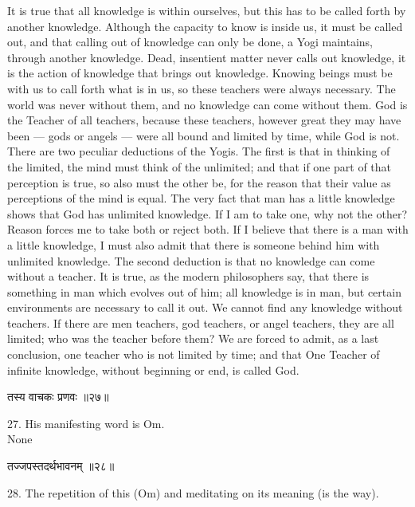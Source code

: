 It is true that all knowledge is within ourselves, but this
has to be called forth by another knowledge. Although the capacity to
know is inside us, it must be called out, and that calling out of
knowledge can only be done, a Yogi maintains, through another
knowledge. Dead, insentient matter never calls out knowledge, it is the
action of knowledge that brings out knowledge. Knowing beings must be
with us to call forth what is in
us, so these teachers were always necessary. The world was never
without them, and no knowledge can come without them. God is the
Teacher of all teachers, because these teachers, however great they may
have been — gods or angels — were all bound and limited by time, while
God is not. There are two peculiar deductions of the Yogis. The first
is that in thinking of the limited, the mind must think of the
unlimited; and that if one part of that perception is true, so also
must the other be, for the reason that their value as perceptions of
the mind is equal. The very fact that man has a little knowledge shows
that God has unlimited knowledge. If I am to take one, why not the
other? Reason forces me to take both or reject both. If I believe that
there is a man with a little knowledge, I must also admit that there is
someone behind him with unlimited knowledge. The second deduction is
that no knowledge can come without a teacher. It is true, as the modern
philosophers say, that there is something in man which evolves out of
him; all knowledge is in man, but certain environments are necessary to
call it out. We cannot find any knowledge without teachers. If there
are men teachers, god teachers, or angel teachers, they are all
limited; who was the teacher before them? We are forced to admit, as a
last conclusion, one teacher who is not limited by time; and that One
Teacher of infinite knowledge, without beginning or end, is called God.
\\

\begin{center}
\begin{sanskrit}
तस्य वाचकः प्रणवः ॥२७॥
\end{sanskrit}
\end{center}
27. His manifesting word is Om. \\

None\\

\begin{center}
\begin{sanskrit}
तज्जपस्तदर्थभावनम् ॥२८॥
\end{sanskrit}
\end{center}
28. The repetition of this (Om) and meditating on its meaning
(is the way). \\

